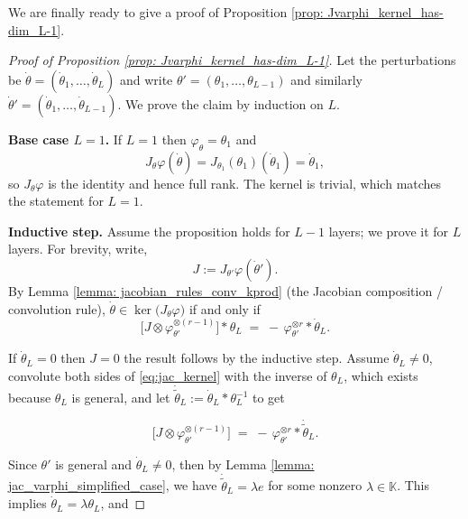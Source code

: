 \documentclass[final]{article}
\newcommand{\K}{\mathbb{K}}
\newcommand{\conv}{\ast}
\newcommand{\kprod}{\otimes}
\theoremstyle{definition}
\theoremstyle{plain}
\begin{document}
We are finally ready to give a proof of Proposition \ref{prop: Jvarphi_kernel_has-dim_L-1}.
\begin{proof}[Proof of Proposition \ref{prop: Jvarphi_kernel_has-dim_L-1}]


Let the perturbations be $\dot\theta=(\dot\theta_1,\dots,\dot\theta_L)$ and write $\theta'=(\theta_1,\dots,\theta_{L-1})$ and similarly $\dot\theta'=(\dot\theta_1,\dots,\dot\theta_{L-1})$.
We prove the claim by induction on $L$.

\medskip\noindent\textbf{Base case $L=1$.}
If $L=1$ then $\varphi_\theta=\theta_1$ and
\[
J_{\theta}\varphi(\dot\theta)=J_{\theta_1}(\theta_1)(\dot\theta_1)=\dot\theta_1,
\]
so $J_{\theta}\varphi$ is the identity and hence full rank. The kernel is trivial, which matches the statement for $L=1$.

\medskip\noindent\textbf{Inductive step.}
Assume the proposition holds for $L-1$ layers; we prove it for $L$ layers.
For brevity, write,
\[
J := J_{\theta'}\varphi(\dot{\theta}').
\]
By Lemma \ref{lemma: jacobian_rules_conv_kprod} (the Jacobian composition / convolution rule),
$\dot\theta\in\ker\bigl(J_{\theta}\varphi\bigr)$ if and only if
\begin{equation}\label{eq:jac_kernel}
\bigl[J\kprod \varphi_{\theta'}^{\otimes (r-1)}\bigr]\conv \theta_L
\;=\;
-\,\varphi_{\theta'}^{\otimes r}\conv \dot\theta_L.
\end{equation}

If $\dot \theta_L = 0$ then $J = 0$ the result follows by the inductive step.
Assume $\dot \theta_L \neq 0$, convolute both sides of \eqref{eq:jac_kernel} with the inverse of $\theta_L$, which exists because $\theta_L$ is general, and let $\dot{\tilde{\theta}}_L := \dot \theta_L \conv \theta_L^{-1}$ to get 

\begin{equation}\label{eq:jac_kernel_mult_by_theta_L_inverse}
\bigl[J\kprod \varphi_{\theta'}^{\otimes (r-1)}\bigr]
\;=\;
-\,\varphi_{\theta'}^{\otimes r}\conv \dot{\tilde{\theta}}_L.
\end{equation}

Since $\theta'$ is general and $\dot \theta_L \neq 0$, then by Lemma \ref{lemma: jac_varphi_simplified_case}, we have $\dot{\tilde{\theta}}_L = \lambda e$ for some nonzero $\lambda \in \K$.
This implies $\dot \theta_L = \lambda \theta_L$, and

\end{proof}
\end{document}
